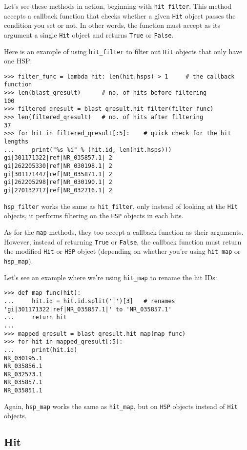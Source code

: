 \documentclass{report}
\begin{document}
Let's see these methods in action, beginning with \verb|hit_filter|. This method
accepts a callback function that checks whether a given \verb|Hit| object passes
the condition you set or not. In other words, the function must accept as its
argument a single \verb|Hit| object and returns \verb|True| or \verb|False|.

Here is an example of using \verb|hit_filter| to filter out \verb|Hit| objects
that only have one HSP:

\begin{verbatim}
>>> filter_func = lambda hit: len(hit.hsps) > 1     # the callback function
>>> len(blast_qresult)      # no. of hits before filtering
100
>>> filtered_qresult = blast_qresult.hit_filter(filter_func)
>>> len(filtered_qresult)   # no. of hits after filtering
37
>>> for hit in filtered_qresult[:5]:    # quick check for the hit lengths
...     print("%s %i" % (hit.id, len(hit.hsps)))
gi|301171322|ref|NR_035857.1| 2
gi|262205330|ref|NR_030198.1| 2
gi|301171447|ref|NR_035871.1| 2
gi|262205298|ref|NR_030190.1| 2
gi|270132717|ref|NR_032716.1| 2
\end{verbatim}

\verb|hsp_filter| works the same as \verb|hit_filter|, only instead of looking
at the \verb|Hit| objects, it performs filtering on the \verb|HSP| objects in
each hits.

As for the \verb|map| methods, they too accept a callback function as their
arguments. However, instead of returning \verb|True| or \verb|False|, the
callback function must return the modified \verb|Hit| or \verb|HSP| object
(depending on whether you're using \verb|hit_map| or \verb|hsp_map|).

Let's see an example where we're using \verb|hit_map| to rename the hit IDs:

\begin{verbatim}
>>> def map_func(hit):
...     hit.id = hit.id.split('|')[3]   # renames 'gi|301171322|ref|NR_035857.1|' to 'NR_035857.1'
...     return hit
...
>>> mapped_qresult = blast_qresult.hit_map(map_func)
>>> for hit in mapped_qresult[:5]:
...     print(hit.id)
NR_030195.1
NR_035856.1
NR_032573.1
NR_035857.1
NR_035851.1
\end{verbatim}

Again, \verb|hsp_map| works the same as \verb|hit_map|, but on \verb|HSP|
objects instead of \verb|Hit| objects.

\subsection{Hit}
\label{sec:searchio-hit}
\end{document}
